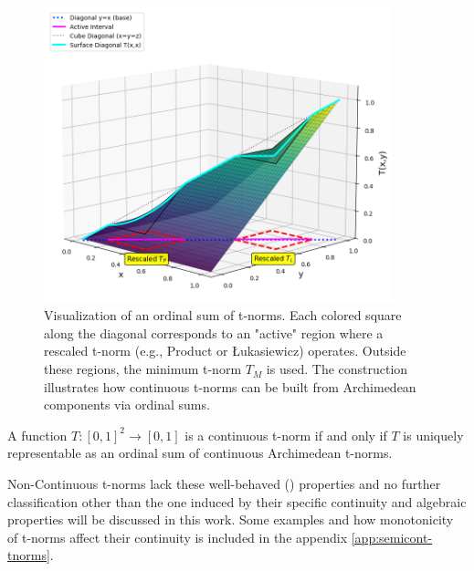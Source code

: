 \begin{figure}[!ht]
    \centering
    \includegraphics[width=0.9\textwidth]{ch1/figures/ordinal_sums.png}
    \caption{Visualization of an ordinal sum of t-norms. Each colored square along the diagonal corresponds to an "active" region where a rescaled t-norm (e.g., Product or Łukasiewicz) operates. Outside these regions, the minimum t-norm $T_M$ is used. The construction illustrates how continuous t-norms can be built from Archimedean components via ordinal sums.}
    \label{fig:ordinal_sum_tnorm}
\end{figure}



\begin{theorem}
  A function $T: [0,1]^2 \to [0,1]$ is a continuous t-norm if and only if $T$ is uniquely representable as an ordinal sum of continuous Archimedean t-norms.
\end{theorem}

Non-Continuous t-norms lack these well-behaved () properties and no further classification other than the one induced by their specific continuity and algebraic properties will be discussed in this work. Some examples and how monotonicity of t-norms affect their continuity is included in the appendix \ref{app:semicont-tnorms}.



